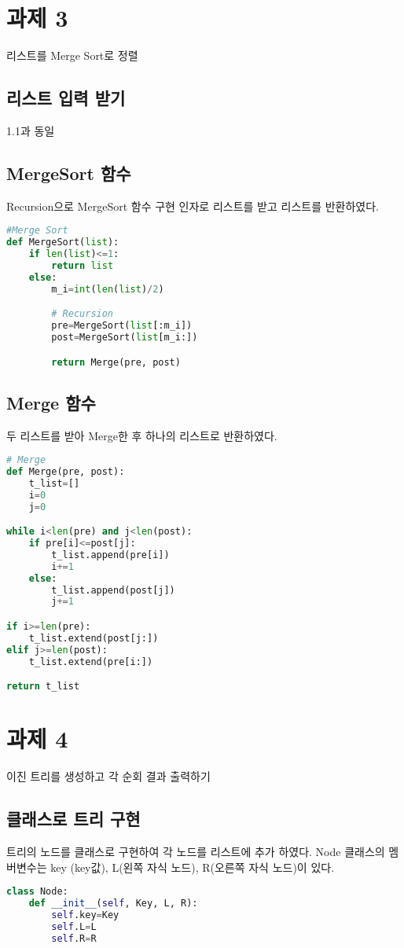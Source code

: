 \documentclass{article}
\begin{document}
	\section{과제 3}
		리스트를 Merge Sort로 정렬
	\subsection{리스트 입력 받기}
	1.1과 동일
	\subsection{MergeSort 함수}
	Recursion으로 MergeSort 함수 구현
	인자로 리스트를 받고 리스트를 반환하였다.
	\begin{lstlisting}[language=Python]
#Merge Sort
def MergeSort(list):
	if len(list)<=1:
		return list
	else:
		m_i=int(len(list)/2)

		# Recursion
		pre=MergeSort(list[:m_i])
		post=MergeSort(list[m_i:])

		return Merge(pre, post)
	\end{lstlisting}
	\subsection{Merge 함수}
	두 리스트를 받아 Merge한 후 하나의 리스트로 반환하였다.
	\begin{lstlisting}[language=Python]
# Merge
def Merge(pre, post):
	t_list=[]
	i=0
	j=0

while i<len(pre) and j<len(post):
	if pre[i]<=post[j]:
		t_list.append(pre[i])
		i+=1
	else:
		t_list.append(post[j])
		j+=1

if i>=len(pre):
	t_list.extend(post[j:])
elif j>=len(post):
	t_list.extend(pre[i:])

return t_list
	\end{lstlisting}

	\section{과제 4}
	이진 트리를 생성하고 각 순회 결과 출력하기
	\subsection{클래스로 트리 구현}
	트리의 노드를 클래스로 구현하여 각 노드를 리스트에 추가 하였다. 
	 Node 클래스의 멤버변수는 key (key값), L(왼쪽 자식 노드), R(오른쪽 자식 노드)이 있다.
	\begin{lstlisting}[language=Python]
class Node:
	def __init__(self, Key, L, R):
		self.key=Key
		self.L=L
		self.R=R
	\end{lstlisting}
\end{document}
